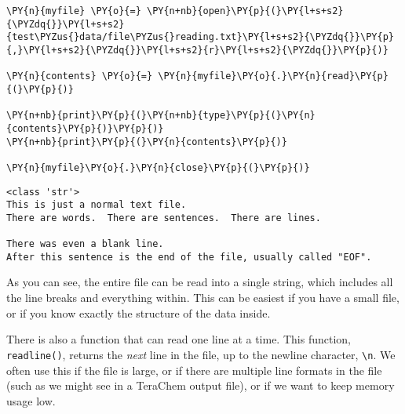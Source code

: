     \begin{tcolorbox}[breakable, size=fbox, boxrule=1pt, pad at break*=1mm,colback=cellbackground, colframe=cellborder]
\begin{Verbatim}[commandchars=\\\{\}]
\PY{n}{myfile} \PY{o}{=} \PY{n+nb}{open}\PY{p}{(}\PY{l+s+s2}{\PYZdq{}}\PY{l+s+s2}{test\PYZus{}data/file\PYZus{}reading.txt}\PY{l+s+s2}{\PYZdq{}}\PY{p}{,}\PY{l+s+s2}{\PYZdq{}}\PY{l+s+s2}{r}\PY{l+s+s2}{\PYZdq{}}\PY{p}{)}

\PY{n}{contents} \PY{o}{=} \PY{n}{myfile}\PY{o}{.}\PY{n}{read}\PY{p}{(}\PY{p}{)}

\PY{n+nb}{print}\PY{p}{(}\PY{n+nb}{type}\PY{p}{(}\PY{n}{contents}\PY{p}{)}\PY{p}{)}
\PY{n+nb}{print}\PY{p}{(}\PY{n}{contents}\PY{p}{)}

\PY{n}{myfile}\PY{o}{.}\PY{n}{close}\PY{p}{(}\PY{p}{)}
\end{Verbatim}
\end{tcolorbox}

    \begin{Verbatim}[commandchars=\\\{\}]
<class 'str'>
This is just a normal text file.
There are words.  There are sentences.  There are lines.

There was even a blank line.
After this sentence is the end of the file, usually called "EOF".
    \end{Verbatim}

    As you can see, the entire file can be read into a single string, which
includes all the line breaks and everything within. This can be easiest
if you have a small file, or if you know exactly the structure of the
data inside.

There is also a function that can read one line at a time. This
function, \texttt{readline()}, returns the \emph{next} line in the file,
up to the newline character, \texttt{\textbackslash{}n}. We often use
this if the file is large, or if there are multiple line formats in the
file (such as we might see in a TeraChem output file), or if we want to
keep memory usage low.

